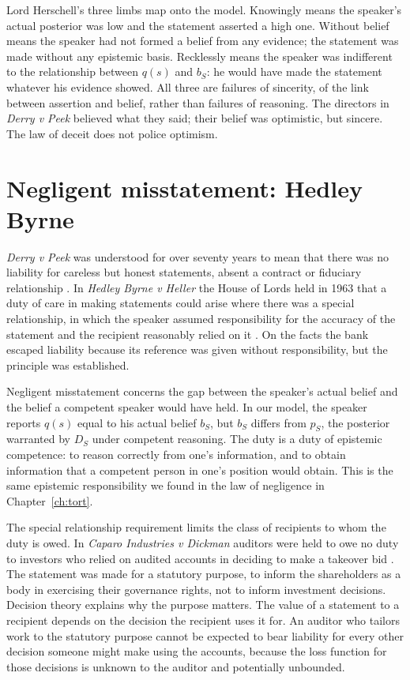 Lord Herschell's three limbs map onto the model. Knowingly means the speaker's actual posterior was low and the statement asserted a high one. Without belief means the speaker had not formed a belief from any evidence; the statement was made without any epistemic basis. Recklessly means the speaker was indifferent to the relationship between $q(s)$ and $b_S$: he would have made the statement whatever his evidence showed. All three are failures of sincerity, of the link between assertion and belief, rather than failures of reasoning. The directors in \emph{Derry v Peek} believed what they said; their belief was optimistic, but sincere. The law of deceit does not police optimism.

\section{Negligent misstatement: Hedley Byrne}

\emph{Derry v Peek} was understood for over seventy years to mean that there was no liability for careless but honest statements, absent a contract or fiduciary relationship \citep{nocton1914}. In \emph{Hedley Byrne v Heller} the House of Lords held in 1963 that a duty of care in making statements could arise where there was a special relationship, in which the speaker assumed responsibility for the accuracy of the statement and the recipient reasonably relied on it \citep{hedleybyrne1964}. On the facts the bank escaped liability because its reference was given without responsibility, but the principle was established.

Negligent misstatement concerns the gap between the speaker's actual belief and the belief a competent speaker would have held. In our model, the speaker reports $q(s)$ equal to his actual belief $b_S$, but $b_S$ differs from $p_S$, the posterior warranted by $D_S$ under competent reasoning. The duty is a duty of epistemic competence: to reason correctly from one's information, and to obtain information that a competent person in one's position would obtain. This is the same epistemic responsibility we found in the law of negligence in Chapter~\ref{ch:tort}.

The special relationship requirement limits the class of recipients to whom the duty is owed. In \emph{Caparo Industries v Dickman} auditors were held to owe no duty to investors who relied on audited accounts in deciding to make a takeover bid \citep{caparo1990}. The statement was made for a statutory purpose, to inform the shareholders as a body in exercising their governance rights, not to inform investment decisions. Decision theory explains why the purpose matters. The value of a statement to a recipient depends on the decision the recipient uses it for. An auditor who tailors work to the statutory purpose cannot be expected to bear liability for every other decision someone might make using the accounts, because the loss function for those decisions is unknown to the auditor and potentially unbounded.

